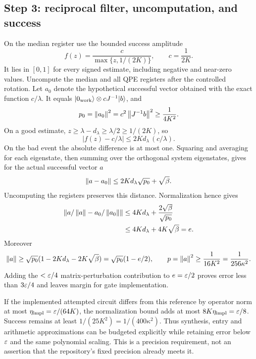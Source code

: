\subsection{Step 3: reciprocal filter, uncomputation, and success}
On the median register use the bounded success amplitude
\begin{equation}
 f(z)=\frac{c}{\max\{z,1/(2K)\}},\qquad c=\frac1{2K}.
\end{equation}
It lies in $[0,1]$ for every signed estimate, including negative and near-zero values. Uncompute the median and all QPE registers after the controlled rotation. Let $a_0$ denote the hypothetical successful vector obtained with the exact function $c/\lambda$. It equals $|0_{\rm work}\rangle\otimes cJ^{-1}|b\rangle$, and
\begin{equation}
 p_0=\left\lVert a_0\right\rVert^2=c^2\left\lVert J^{-1}b\right\rVert^2\geq\frac1{4K^2}.
\end{equation}
On a good estimate, $z\geq\lambda-d_\lambda\geq\lambda/2\geq1/(2K)$, so
\begin{equation}
 |f(z)-c/\lambda|\leq 2K d_\lambda\,(c/\lambda).
\end{equation}
On the bad event the absolute difference is at most one. Squaring and averaging for each eigenstate, then summing over the orthogonal system eigenstates, gives for the actual successful vector $a$
\begin{equation}
 \left\lVert a-a_0\right\rVert\leq2K d_\lambda\sqrt{p_0}+\sqrt\beta.
\end{equation}
Uncomputing the registers preserves this distance. Normalization hence gives
\begin{align}
 \left\lVert a/\left\lVert a\right\rVert-a_0/\left\lVert a_0\right\rVert\right\rVert
 &\leq4K d_\lambda+\frac{2\sqrt\beta}{\sqrt{p_0}}\\
 &\leq4K d_\lambda+4K\sqrt\beta=e.
\end{align}
Moreover
\begin{equation}
 \left\lVert a\right\rVert\geq\sqrt{p_0}(1-2K d_\lambda-2K\sqrt\beta)
 =\sqrt{p_0}(1-e/2),\qquad
 p=\left\lVert a\right\rVert^2\geq\frac1{16K^2}=\frac1{256\kappa^2}.
\end{equation}
Adding the $<\varepsilon/4$ matrix-perturbation contribution to $e=\varepsilon/2$ proves error less than $3\varepsilon/4$ and leaves margin for gate implementation.

If the implemented attempted circuit differs from this reference by operator norm at most $\eta_{\rm impl}=\varepsilon/(64K)$, the normalization bound adds at most $8K\eta_{\rm impl}=\varepsilon/8$. Success remains at least $1/(25K^2)=1/(400\kappa^2)$. Thus synthesis, entry and arithmetic approximations can be budgeted explicitly while retaining error below $\varepsilon$ and the same polynomial scaling. This is a precision requirement, not an assertion that the repository's fixed precision already meets it.

